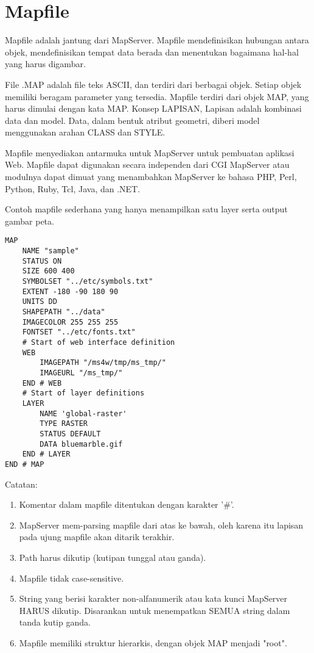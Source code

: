 \section{Mapfile}
Mapfile adalah jantung dari MapServer. Mapfile mendefinisikan hubungan antara objek, mendefinisikan tempat data berada dan menentukan bagaimana hal-hal yang harus digambar. 

File .MAP adalah file teks ASCII, dan terdiri dari berbagai objek. Setiap objek memiliki beragam parameter yang tersedia. Mapfile terdiri dari objek MAP, yang harus dimulai dengan kata MAP. Konsep LAPISAN, Lapisan adalah kombinasi data dan model. Data, dalam bentuk atribut geometri, diberi model menggunakan arahan CLASS dan STYLE.

Mapfile menyediakan antarmuka untuk MapServer untuk pembuatan aplikasi Web. Mapfile dapat digunakan secara independen dari CGI MapServer atau modulnya dapat dimuat yang menambahkan MapServer ke bahasa PHP, Perl, Python, Ruby, Tcl, Java, dan .NET.

Contoh mapfile sederhana yang hanya menampilkan satu layer serta output gambar peta.
\begin{lstlisting}
MAP
    NAME "sample"
    STATUS ON
    SIZE 600 400
    SYMBOLSET "../etc/symbols.txt"
    EXTENT -180 -90 180 90
    UNITS DD
    SHAPEPATH "../data"
    IMAGECOLOR 255 255 255
    FONTSET "../etc/fonts.txt"
    # Start of web interface definition
    WEB
        IMAGEPATH "/ms4w/tmp/ms_tmp/"
        IMAGEURL "/ms_tmp/"
    END # WEB
    # Start of layer definitions
    LAYER
        NAME 'global-raster'
        TYPE RASTER
        STATUS DEFAULT
        DATA bluemarble.gif
    END # LAYER
END # MAP
\end{lstlisting}

Catatan:
\begin{enumerate}
\item Komentar dalam mapfile ditentukan dengan karakter '\#'.
\item MapServer mem-parsing mapfile dari atas ke bawah, oleh karena itu lapisan pada ujung mapfile akan ditarik terakhir.
\item Path harus dikutip (kutipan tunggal atau ganda).
\item Mapfile tidak case-sensitive.
\item String yang berisi karakter non-alfanumerik atau kata kunci MapServer HARUS dikutip. Disarankan untuk menempatkan SEMUA string dalam tanda kutip ganda.
\item Mapfile memiliki struktur hierarkis, dengan objek MAP menjadi "root".
\end{enumerate}

